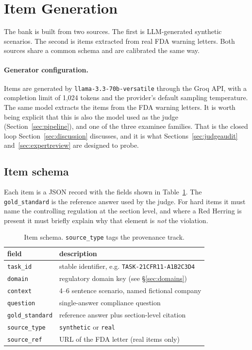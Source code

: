 \section{Item Generation}
\label{sec:itemgen}

The bank is built from two sources. The first is LLM-generated synthetic
scenarios. The second is items extracted from real FDA warning letters.
Both sources share a common schema and are calibrated the same way.

\paragraph{Generator configuration.}
Items are generated by \texttt{llama-3.3-70b-versatile} through the Groq
API, with a completion limit of 1{,}024 tokens and the provider's
default sampling temperature. The same model extracts the items from the
FDA warning letters. It is worth being explicit that this is also the
model used as the judge (Section~\ref{sec:pipeline}), and one of the
three examinee families. That is the closed loop
Section~\ref{sec:discussion} discusses, and it is what
Sections~\ref{sec:judgeaudit} and~\ref{sec:expertreview} are designed to
probe.

\subsection{Item schema}
Each item is a JSON record with the fields shown in
Table~\ref{tab:schema}. The \texttt{gold\_standard} is the reference
answer used by the judge. For hard items it must name the controlling
regulation at the section level, and where a Red Herring is present it
must briefly explain why that element is \emph{not} the violation.

\begin{table}[htbp]
\centering
\small
\begin{tabular}{@{}ll@{}}
\toprule
field & description \\
\midrule
\texttt{task\_id}      & stable identifier, e.g. \texttt{TASK-21CFR11-A1B2C3D4} \\
\texttt{domain}        & regulatory domain key (see \S\ref{sec:domains}) \\
\texttt{context}       & 4--6 sentence scenario, named fictional company \\
\texttt{question}      & single-answer compliance question \\
\texttt{gold\_standard}& reference answer plus section-level citation \\
\texttt{source\_type}  & \texttt{synthetic} or \texttt{real} \\
\texttt{source\_ref}   & URL of the FDA letter (real items only) \\
\bottomrule
\end{tabular}
\caption{Item schema. \texttt{source\_type} tags the provenance track.}
\label{tab:schema}
\end{table}

